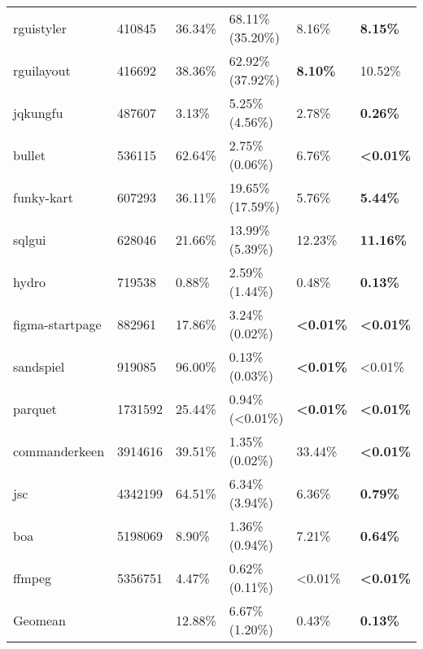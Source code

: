 \begin{tabular}{llllll}
 rguistyler      & 410845  & 36.34\%         & 68.11\% (35.20\%)          & 8.16\%                     & \textbf{8.15\%}            \\
 rguilayout      & 416692  & 38.36\%         & 62.92\% (37.92\%)          & \textbf{8.10\%}            & 10.52\%                    \\
 jqkungfu        & 487607  & 3.13\%          & 5.25\% (4.56\%)            & 2.78\%                     & \textbf{0.26\%}            \\
 bullet          & 536115  & 62.64\%         & 2.75\% (0.06\%)            & 6.76\%                     & \textbf{\textless{}0.01\%} \\
 funky-kart      & 607293  & 36.11\%         & 19.65\% (17.59\%)          & 5.76\%                     & \textbf{5.44\%}            \\
 sqlgui          & 628046  & 21.66\%         & 13.99\% (5.39\%)           & 12.23\%                    & \textbf{11.16\%}           \\
 hydro           & 719538  & 0.88\%          & 2.59\% (1.44\%)            & 0.48\%                     & \textbf{0.13\%}            \\
 figma-startpage & 882961  & 17.86\%         & 3.24\% (0.02\%)            & \textbf{\textless{}0.01\%} & \textbf{\textless{}0.01\%} \\
 sandspiel       & 919085  & 96.00\%         & 0.13\% (0.03\%)            & \textbf{\textless{}0.01\%} & \textless{}0.01\%          \\
 parquet         & 1731592 & 25.44\%         & 0.94\% (\textless{}0.01\%) & \textbf{\textless{}0.01\%} & \textbf{\textless{}0.01\%} \\
 commanderkeen   & 3914616 & 39.51\%         & 1.35\% (0.02\%)            & 33.44\%                    & \textbf{\textless{}0.01\%} \\
 jsc             & 4342199 & 64.51\%         & 6.34\% (3.94\%)            & 6.36\%                     & \textbf{0.79\%}            \\
 boa             & 5198069 & 8.90\%          & 1.36\% (0.94\%)            & 7.21\%                     & \textbf{0.64\%}            \\
 ffmpeg          & 5356751 & 4.47\%          & 0.62\% (0.11\%)            & \textless{}0.01\%          & \textbf{\textless{}0.01\%} \\
 Geomean         &         & 12.88\%         & 6.67\% (1.20\%)            & 0.43\%                     & \textbf{0.13\%}            \\
\hline
\end{tabular}